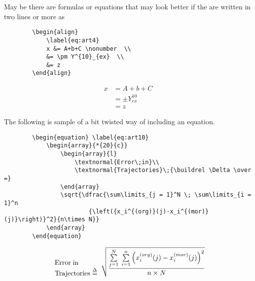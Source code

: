 %
May be there are formulas or equations that may look better if the are written in two lines or more as 
%
%
\begin{SBN}
	\begin{verbatim}
		\begin{align}
			\label{eq:art4}
			x &= A+b+C \nonumber  \\
			&= \pm Y^{10}_{ex}  \\
			&= z
		\end{align}
	\end{verbatim}
	\medskip
	\begin{align}
		\label{eq:art4}
		x &= A+b+C \nonumber  \\
		&= \pm Y^{10}_{ex}  \\
		&= z
	\end{align}
\end{SBN}

%
%
The following is sample of a bit twisted way of including an equation.
%
\begin{SBN}
	\begin{verbatim}
		\begin{equation} \label{eq:art10}
			\begin{array}{*{20}{c}}
				\begin{array}{l}
					\textnormal{Error\;in}\\
					\textnormal{Trajectories}\;{\buildrel \Delta \over =}
				\end{array}
				\sqrt{\dfrac{\sum\limits_{j = 1}^N \; \sum\limits_{i = 1}^n 
						{\left({x_i^{(org)}(j)-x_i^{(mor)}(j)}\right)}^2}{n\times N}}
			\end{array}
		\end{equation}
	\end{verbatim}
	\medskip
	\begin{equation} \label{eq:art10}
		\begin{array}{*{20}{c}}
			\begin{array}{l}
				\textnormal{Error\;in}\\
				\textnormal{Trajectories}\;{\buildrel \Delta \over =}
			\end{array}
			\sqrt{\dfrac{\sum\limits_{j = 1}^N \; \sum\limits_{i = 1}^n {\left( {x_i^{(org)}(j)-x_i^{(mor)}(j)} \right)}^2}{n \times N}}
		\end{array}
	\end{equation}
\end{SBN}
%
%

\np
{}

